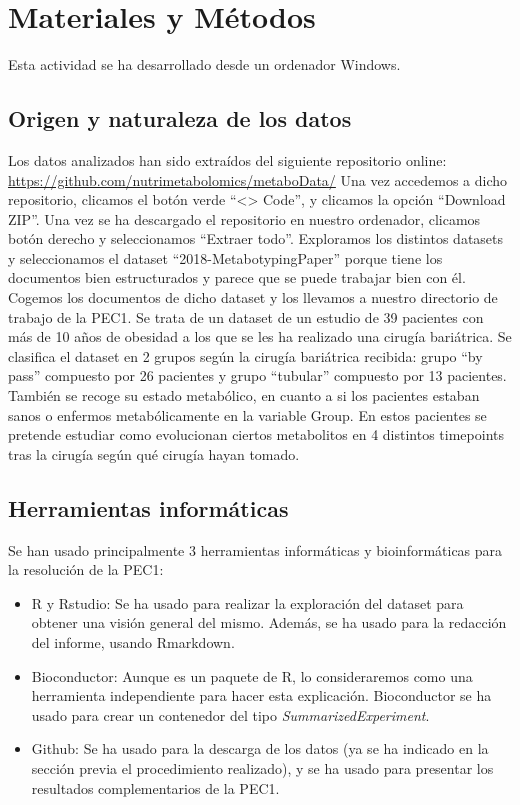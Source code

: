 \documentclass[
]{article}
\begin{document}
\section{Materiales y Métodos}\label{materiales-y-muxe9todos}

Esta actividad se ha desarrollado desde un ordenador Windows.

\subsection{Origen y naturaleza de los
datos}\label{origen-y-naturaleza-de-los-datos}

Los datos analizados han sido extraídos del siguiente repositorio
online: \url{https://github.com/nutrimetabolomics/metaboData/} Una vez
accedemos a dicho repositorio, clicamos el botón verde
``\textless\textgreater{} Code'', y clicamos la opción ``Download ZIP''.
Una vez se ha descargado el repositorio en nuestro ordenador, clicamos
botón derecho y seleccionamos ``Extraer todo''. Exploramos los distintos
datasets y seleccionamos el dataset ``2018-MetabotypingPaper'' porque
tiene los documentos bien estructurados y parece que se puede trabajar
bien con él. Cogemos los documentos de dicho dataset y los llevamos a
nuestro directorio de trabajo de la PEC1. Se trata de un dataset de un
estudio de 39 pacientes con más de 10 años de obesidad a los que se les
ha realizado una cirugía bariátrica. Se clasifica el dataset en 2 grupos
según la cirugía bariátrica recibida: grupo ``by pass'' compuesto por 26
pacientes y grupo ``tubular'' compuesto por 13 pacientes. También se
recoge su estado metabólico, en cuanto a si los pacientes estaban sanos
o enfermos metabólicamente en la variable Group. En estos pacientes se
pretende estudiar como evolucionan ciertos metabolitos en 4 distintos
timepoints tras la cirugía según qué cirugía hayan tomado.

\subsection{Herramientas
informáticas}\label{herramientas-informuxe1ticas}

Se han usado principalmente 3 herramientas informáticas y
bioinformáticas para la resolución de la PEC1:

\begin{itemize}
\item
  R y Rstudio: Se ha usado para realizar la exploración del dataset para
  obtener una visión general del mismo. Además, se ha usado para la
  redacción del informe, usando Rmarkdown.
\item
  Bioconductor: Aunque es un paquete de R, lo consideraremos como una
  herramienta independiente para hacer esta explicación. Bioconductor se
  ha usado para crear un contenedor del tipo
  \emph{SummarizedExperiment}.
\item
  Github: Se ha usado para la descarga de los datos (ya se ha indicado
  en la sección previa el procedimiento realizado), y se ha usado para
  presentar los resultados complementarios de la PEC1.
\end{itemize}
\end{document}
